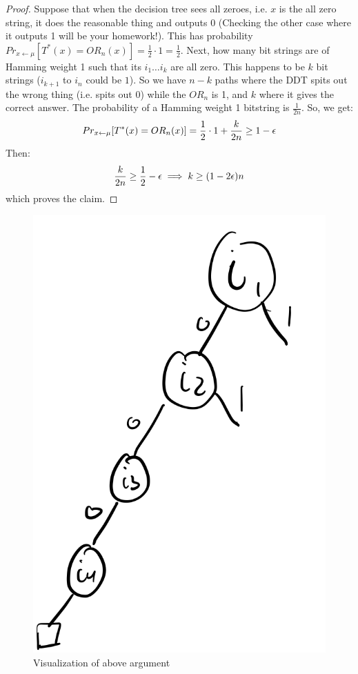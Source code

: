 \begin{proof}
    Suppose that when the decision tree sees all zeroes, i.e. $x$ is the all zero string, it does the reasonable thing and outputs $0$ (Checking the other case where it outputs 1 will be your homework!). This has probability $Pr_{x \leftarrow \mu}[T^*(x) = OR_n(x)] = \frac{1}{2} \cdot 1 = \frac{1}{2}$. Next, how many bit strings are of Hamming weight 1 such that its $i_1 \ldots i_{k}$ are all zero. This happens to be $k$ bit strings ($i_{k+1}$ to $i_n$ could be $1$). So we have $n-k$ paths where the DDT spits out the wrong thing (i.e. spits out 0) while the $OR_n$ is 1, and $k$ where it gives the correct answer. The probability of a Hamming weight 1 bitstring is $\frac{1}{2n}$.  So, we get:
    \begin{equation}
        Pr_{x \leftarrow \mu}[T^*(x) = OR_n(x)] = \frac{1}{2} \cdot 1 + \frac{k}{2n} \geq 1 - \epsilon
    \end{equation}
    Then:
    \begin{equation}
        \frac{k}{2n} \geq \frac{1}{2} - \epsilon \implies k \geq (1-2\epsilon)n
    \end{equation}
    which proves the claim.
\end{proof}


\begin{figure}[htbp!]
    \centering
    \includegraphics[scale=0.8]{Images/fig-lec2-orn.png}
    \caption{Visualization of above argument}
    \label{lec2-orn}
\end{figure}

